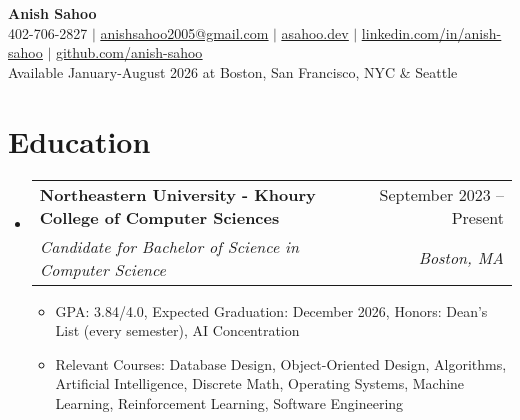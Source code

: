 \documentclass[letterpaper,11pt]{article}
\makeatletter
\newcommand{\resumeItem}[1]{
  \item\small{
    {#1 \vspace{-2pt}}
  }
}
\newcommand{\resumeSubheading}[4]{
  \vspace{-2pt}\item
    \begin{tabular*}{0.97\textwidth}[t]{l@{\extracolsep{\fill}}r}
      \textbf{#1} & #2 \\
      \textit{\small#3} & \textit{\small #4} \\
    \end{tabular*}\vspace{-7pt}
}
\newcommand{\resumeSubHeadingListStart}{\begin{itemize}[leftmargin=0.15in, label={}]}
\newcommand{\resumeSubHeadingListEnd}{\end{itemize}}
\newcommand{\resumeItemListStart}{\begin{itemize}}
\newcommand{\resumeItemListEnd}{\end{itemize}\vspace{-5pt}}
\makeatother
\begin{document}

\begin{center}
    \textbf{\Huge Anish Sahoo} \\ \vspace{1pt}
    \small 402-706-2827 
    $|$ 
    \href{mailto:anishsahoo2005@gmail.com}{\underline{anishsahoo2005@gmail.com}} $|$ 
    \href{https://asahoo.dev}{\underline{asahoo.dev}}
    $|$
    \href{https://linkedin.com/in/anish-sahoo}{\underline{linkedin.com/in/anish-sahoo}} $|$
    \href{https://github.com/anish-sahoo}{\underline{github.com/anish-sahoo}} \vspace{1pt} \\
    Available January-August 2026 at Boston, San Francisco, NYC \& Seattle %
\end{center}


\section{Education}
  \resumeSubHeadingListStart
    \resumeSubheading
      {Northeastern University - Khoury College of Computer Sciences}{September 2023 -- Present}
      {Candidate for Bachelor of Science in Computer Science}{Boston, MA}
    \resumeItemListStart
        \resumeItem{GPA: 3.84/4.0, Expected Graduation: December 2026, Honors: Dean's List (every semester), AI Concentration}
        \resumeItem{Relevant Courses: Database Design, Object-Oriented Design, Algorithms, Artificial Intelligence, Discrete Math, Operating Systems, Machine Learning, Reinforcement Learning, Software Engineering}
    \resumeItemListEnd
  \resumeSubHeadingListEnd
\end{document}
